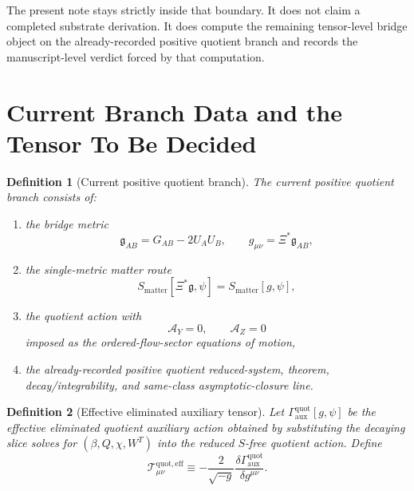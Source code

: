 \documentclass[11pt]{article}
\newcommand{\BridgeMetric}{\mathfrak{g}}
\newcommand{\AY}{\mathcal A_Y}
\newcommand{\AZ}{\mathcal A_Z}
\newcommand{\EffAux}{\mathcal T_{\mu\nu}^{\mathrm{quot,eff}}}
\newtheorem{definition}{Definition}
\begin{document}
The present note stays strictly inside that boundary. It does not claim a completed substrate derivation. It does compute the remaining tensor-level bridge object on the already-recorded positive quotient branch and records the manuscript-level verdict forced by that computation.

\section{Current Branch Data and the Tensor To Be Decided}

\begin{definition}[Current positive quotient branch]
\label{def:branch}
The \emph{current positive quotient branch} consists of:
\begin{enumerate}
    \item the bridge metric
    \begin{equation}
    \BridgeMetric_{AB}=G_{AB}-2U_AU_B,
    \qquad
    g_{\mu\nu}=\Xi^\ast\BridgeMetric_{AB},
    \label{eq:bridge}
    \end{equation}
    \item the single-metric matter route
    \begin{equation}
    S_{\mathrm{matter}}[\Xi^\ast\BridgeMetric,\psi]
    =
    S_{\mathrm{matter}}[g,\psi],
    \label{eq:matterroute}
    \end{equation}
    \item the quotient action with
    \begin{equation}
    \AY=0,
    \qquad
    \AZ=0
    \label{eq:AYAZ}
    \end{equation}
    imposed as the ordered-flow-sector equations of motion,
    \item the already-recorded positive quotient reduced-system, theorem, decay/integrability, and same-class asymptotic-closure line.
\end{enumerate}
\end{definition}

\begin{definition}[Effective eliminated auxiliary tensor]
\label{def:Teff}
Let \(\Gamma_{\mathrm{aux}}^{\mathrm{quot}}[g,\psi]\) be the effective eliminated quotient auxiliary action obtained by substituting the decaying slice solves for \((\beta,Q,\chi,W^T)\) into the reduced \(S\)-free quotient action. Define
\begin{equation}
\EffAux
\equiv
-\frac{2}{\sqrt{-g}}
\frac{\delta\Gamma_{\mathrm{aux}}^{\mathrm{quot}}}{\delta g^{\mu\nu}}.
\label{eq:Teff}
\end{equation}
\end{definition}
\end{document}
